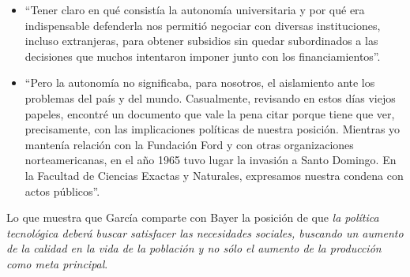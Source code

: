 \begin{itemize}
    \item ``Tener claro en qué consistía la autonomía universitaria y por qué era indispensable defenderla nos permitió negociar con diversas instituciones, incluso extranjeras, para obtener subsidios sin quedar subordinados a las decisiones que muchos intentaron imponer junto con los financiamientos''.
    \item ``Pero la autonomía no significaba, para nosotros, el aislamiento ante los problemas del país y del mundo. Casualmente, revisando en estos días viejos papeles, encontré un documento que vale la pena citar porque tiene que ver, precisamente, con las implicaciones políticas de nuestra posición. Mientras yo mantenía relación con la Fundación Ford y con otras organizaciones norteamericanas, en el año 1965 tuvo lugar la invasión a Santo Domingo. En la Facultad de Ciencias Exactas y Naturales, expresamos nuestra condena con actos públicos''.
\end{itemize}

Lo que muestra que García comparte con Bayer la posición de que \textit{la política tecnológica deberá buscar satisfacer las necesidades sociales, buscando un aumento de la calidad en la vida de la población y no sólo el aumento de la producción como meta principal}.



